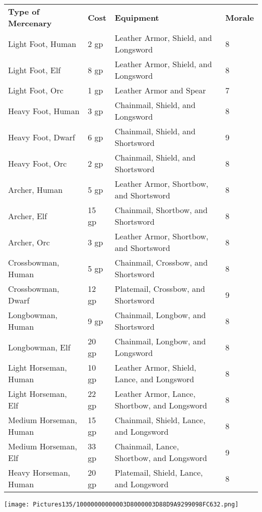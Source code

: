 \documentclass[a4paper,twoside,openany,10pt]{book}
\begin{document}
\begin{tabular*}{0.93\linewidth}{@{\extracolsep{\fill}}llll}
\textbf{Type of Mercenary}&\textbf{Cost}&\textbf{Equipment}&\textbf{Morale}\\
Light Foot, Human&2 gp&Leather Armor, Shield, and Longsword&8\\\toprule
Light Foot, Elf&8 gp&Leather Armor, Shield, and Longsword&8\\\hline
Light Foot, Orc&1 gp&Leather Armor and Spear&7\\\hline
Heavy Foot, Human&3 gp&Chainmail, Shield, and Longsword&8\\\hline
Heavy Foot, Dwarf&6 gp&Chainmail, Shield, and Shortsword&9\\\hline
Heavy Foot, Orc&2 gp&Chainmail, Shield, and Shortsword&8\\\hline
Archer, Human&5 gp&Leather Armor, Shortbow, and Shortsword&8\\\hline
Archer, Elf&15 gp&Chainmail, Shortbow, and Shortsword&8\\\hline
Archer, Orc&3 gp&Leather Armor, Shortbow, and Shortsword&8\\\hline
Crossbowman, Human&5 gp&Chainmail, Crossbow, and Shortsword&8\\\hline
Crossbowman, Dwarf&12 gp&Platemail, Crossbow, and Shortsword&9\\\hline
Longbowman, Human&9 gp&Chainmail, Longbow, and Shortsword&8\\\hline
Longbowman, Elf&20 gp&Chainmail, Longbow, and Longsword&8\\\hline
Light Horseman, Human&10 gp&Leather Armor, Shield, Lance, and Longsword&8\\\hline
Light Horseman, Elf&22 gp&Leather Armor, Lance, Shortbow, and Longsword&8\\\hline
Medium Horseman, Human&15 gp&Chainmail, Shield, Lance, and Longsword&8\\\hline
Medium Horseman, Elf&33 gp&Chainmail, Lance, Shortbow, and Longsword&9\\\hline
Heavy Horseman, Human&20 gp&Platemail, Shield, Lance, and Longsword&8\\\hline
\end{tabular*}

\vfill

\begin{center}
	\texttt{[image: Pictures135/10000000000003D8000003D88D9A9299098FC632.png]}
\end{center}

\pagebreak
\end{document}
